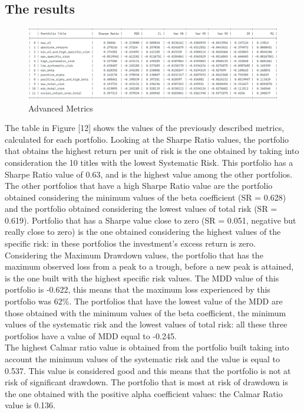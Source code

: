 \documentclass[twocolumn]{article}
\begin{document}
\subsection{The results}
\begin{figure}[b]
\centering\includegraphics[scale=0.5]{advancedMetrics.png}
\caption{Advanced Metrics}
\end{figure}
The table in Figure [12] shows the values of the previously described metrics, calculated for each portfolio. Looking at the Sharpe Ratio values, the portfolio that obtains the highest return per unit of risk is the one obtained by taking into consideration the 10 titles with the lowest Systematic Risk. This portfolio has a Sharpe Ratio value of 0.63, and is the highest value among the other portfolios. The other portfolios that have a high Sharpe Ratio value are the portfolio obtained considering the minimum values of the beta coefficient (SR = 0.628) and the portfolio obtained considering the lowest values of total risk (SR = 0.619).
Portfolio that has a Sharpe value close to zero (SR = 0.051, negative but really close to zero) is the one obtained considering the highest values of the specific risk: in these portfolios the investment's excess return is zero.\\
Considering the Maximum Drawdown values, the portfolio that has the maximum observed loss from a peak to a trough, before a new peak is attained, is the one built with the highest specific risk values. The MDD value of this portfolio is -0.622, this means that the maximum loss experienced by this portfolio was 62\%. The portfolios that have the lowest value of the MDD are those obtained with the minimum values of the beta coefficient, the minimum values of the systematic risk and the lowest values of total risk: all these three portfolios have a value of MDD equal to -0.245.\\
The highest Calmar ratio value is obtained from the portfolio built taking into account the minimum values of the systematic risk and the value is equal to 0.537. This value is considered good and this means that the portfolio is not at risk of significant drawdown.
The portfolio that is most at risk of drawdown is the one obtained with the positive alpha coefficient values: the Calmar Ratio value is 0.136.
\end{document}
